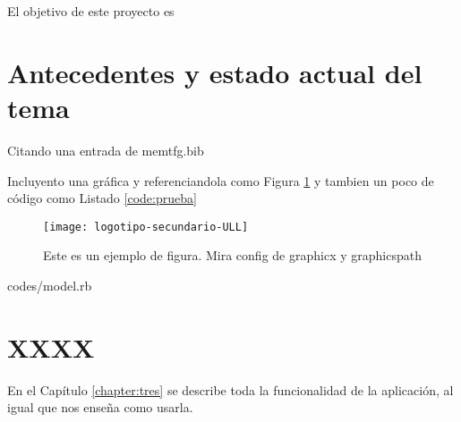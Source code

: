 El objetivo de este proyecto es 

\section{Antecedentes y estado actual del tema}
\label{1:sec:1}


Citando una entrada de memtfg.bib \cite{URL:GitHub}

Incluyento una gráfica y referenciandola como Figura \ref{fig:prueba} y tambien un poco de código como Listado \ref{code:prueba}

\begin{figure}[t]
  \begin{center}
    \texttt{[image: logotipo-secundario-ULL]}
  \end{center}
  \caption{Este es un ejemplo de figura. Mira config de graphicx y  graphicspath}
  \label{fig:prueba}
\end{figure}


                 {codes/model.rb}


\section{XXXX}
\label{1:sec:2}

En el Capítulo \ref{chapter:tres}
se describe toda la funcionalidad de la aplicación, al igual que nos enseña como usarla.\\

